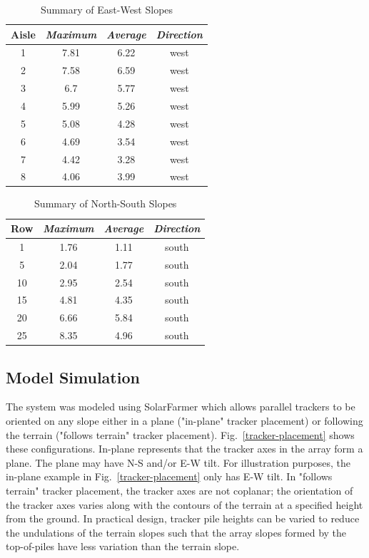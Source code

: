 \documentclass[conference]{IEEEtran}
\begin{document}
\begin{table}[htbp]
\caption{Summary of East-West Slopes}
\begin{center}
\begin{tabular}{|c|c|c|c|}
\hline
\textbf{Aisle} & \textbf{\textit{Maximum}}& \textbf{\textit{Average}}& \textbf{\textit{Direction}} \\
\hline
1& 7.81& 6.22& west \\
\hline
2& 7.58& 6.59& west \\
\hline
3& 6.7& 5.77& west \\
\hline
4&5.99& 5.26& west \\
\hline
5& 5.08& 4.28& west \\
\hline
6& 4.69& 3.54& west \\
\hline
7& 4.42& 3.28& west \\
\hline
8& 4.06& 3.99& west \\
\hline
\end{tabular}
\label{table:ew-slope-summary}
\end{center}
\end{table}

\begin{table}[htbp]
\caption{Summary of North-South Slopes}
\begin{center}
\begin{tabular}{|c|c|c|c|}
\hline
\textbf{Row} & \textbf{\textit{Maximum}}& \textbf{\textit{Average}}& \textbf{\textit{Direction}} \\
\hline
1&  1.76&  1.11& south \\
\hline
5&  2.04&  1.77& south \\
\hline
10& 2.95&  2.54& south \\
\hline
15& 4.81&  4.35& south \\
\hline
20& 6.66&  5.84& south \\
\hline
25& 8.35&  4.96& south \\
\hline
\end{tabular}
\label{table:row-slope-summary}
\end{center}
\end{table}

\subsection{Model Simulation}

The system was modeled using SolarFarmer \cite{Mikofski_8547323} which allows parallel trackers to be oriented on any slope either in a plane ("in-plane" tracker placement) or following the terrain ("follows terrain" tracker placement). Fig.~\ref{tracker-placement} shows these configurations. In-plane represents that the tracker axes in the array form a plane. The plane may have N-S and/or E-W tilt. For illustration purposes, the in-plane example in Fig.~\ref{tracker-placement} only has E-W tilt. In "follows terrain" tracker placement, the tracker axes are not coplanar; the orientation of the tracker axes varies along with the contours of the terrain at a specified height from the ground. In practical design, tracker pile heights can be varied to reduce the undulations of the terrain slopes such that the array slopes formed by the top-of-piles have less variation than the terrain slope.
\end{document}
